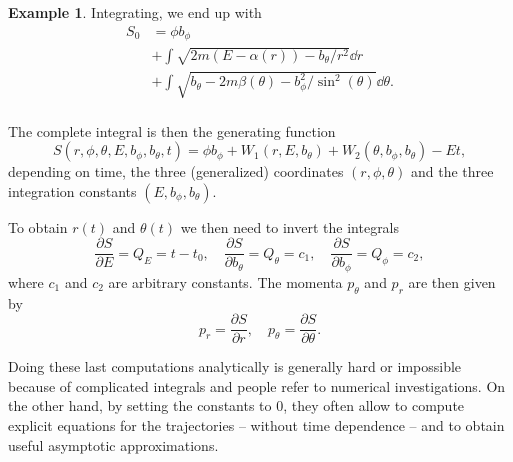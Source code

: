 \documentclass[english,fontsize=11pt,paper=b5]{scrbook}
\theoremstyle{definition}
\newtheorem{example}{Example}[chapter]
\begin{document}
\begin{example}
      Integrating, we end up with
      \begin{align}
        S_0 & = \phi b_\phi                                                               \\
            & + \int\sqrt{2m(E-\alpha(r))-{b_\theta}/{r^2}}\dd r                           \\
            & + \int\sqrt{b_\theta-2m\beta(\theta)-{b_\phi^2}/{\sin^2(\theta)}}\dd \theta. \\
      \end{align}

      The complete integral is then the generating function
      \begin{equation}
        S(r,\phi,\theta,E,b_\phi,b_\theta,t) =
        \phi b_\phi
        + W_1(r, E, b_\theta)
        + W_2(\theta, b_\phi, b_\theta)
        - E t,
      \end{equation}
      depending on time, the three (generalized) coordinates $(r,\phi,\theta)$ and the three integration constants $(E,b_\phi,b_\theta)$.

      To obtain $r(t)$ and $\theta(t)$ we then need to invert the integrals
      \begin{equation}
        \frac{\partial S}{\partial E} = Q_E = t-t_0, \quad
        \frac{\partial S}{\partial b_\theta} = Q_\theta = c_1, \quad
        \frac{\partial S}{\partial b_\phi} = Q_\phi = c_2,
      \end{equation}
      where $c_1$ and $c_2$ are arbitrary constants.
      The momenta $p_\theta$ and $p_r$ are then given by
      \begin{equation}
        p_r = \frac{\partial S}{\partial r}, \quad
        p_\theta = \frac{\partial S}{\partial \theta}.
      \end{equation}

      Doing these last computations analytically is generally hard or impossible because of complicated integrals and people refer to numerical investigations.
      On the other hand, by setting the constants to $0$, they often allow to compute explicit equations for the trajectories -- without time dependence -- and to obtain useful asymptotic approximations.
    \end{example}
\end{document}
